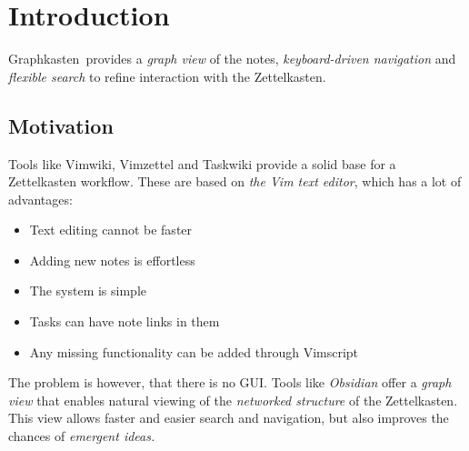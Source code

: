 \documentclass{article}
\title{\projectname}
\author{Kryštof Albrecht \\ \href{mailto:krystofalbrechtus@gmail.com}{krystofalbrechtus@gmail.com}}
\newcommand{\projectname}{Graphkasten}
\begin{document}
\maketitle
\tableofcontents

\newpage

\section{Introduction}

\projectname\ provides a \emph{graph view} of the notes, \emph{keyboard-driven navigation} and \emph{flexible search} to refine interaction with the Zettelkasten.

\subsection{Motivation}

Tools like Vimwiki, Vimzettel and Taskwiki provide a solid base for a Zettelkasten workflow. These are based on \emph{the Vim text editor}, which has a lot of advantages:

\begin{itemize}
	\item Text editing cannot be faster
	
	\item Adding new notes is effortless

	\item The system is simple

	\item Tasks can have note links in them

	\item Any missing functionality can be added through Vimscript
\end{itemize}

The problem is however, that there is no GUI. Tools like \emph{Obsidian} offer a \emph{graph view} that enables natural viewing of the \emph{networked structure} of the Zettelkasten. This view allows faster and easier search and navigation, but also improves the chances of \emph{emergent ideas.}
\end{document}
